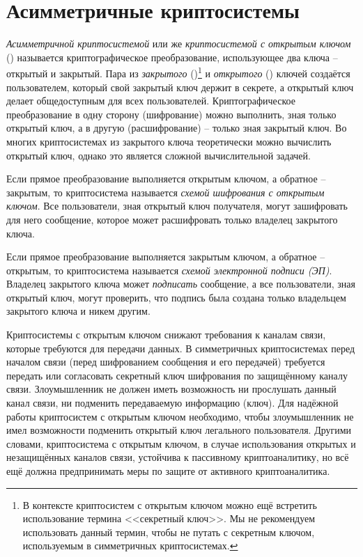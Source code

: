 \chapter{Асимметричные криптосистемы}\label{chapter-public-key}

\emph{Асимметричной криптосистемой} или же \emph{криптосистемой с открытым ключом} () называется криптографическое преобразование, использующее два ключа -- открытый и закрытый. Пара из \emph{закрытого} ()\footnote{В контексте криптосистем с открытым ключом можно ещё встретить использование термина <<секретный ключ>>. Мы не рекомендуем использовать данный термин, чтобы не путать с секретным ключом, используемым в симметричных криптосистемах.} и \emph{открытого} () ключей создаётся пользователем, который свой закрытый ключ держит в секрете, а открытый ключ делает общедоступным для всех пользователей. Криптографическое преобразование в одну сторону (шифрование) можно выполнить, зная только открытый ключ, а в другую (расшифрование) -- только зная закрытый ключ. Во многих криптосистемах из закрытого ключа теоретически можно вычислить открытый ключ, однако это является сложной вычислительной задачей.

Если прямое преобразование выполняется открытым ключом, а обратное -- закрытым, то криптосистема называется \emph{схемой шифрования с открытым ключом}. Все пользователи, зная открытый ключ получателя, могут зашифровать для него сообщение, которое может расшифровать только владелец закрытого ключа.

Если прямое преобразование выполняется закрытым ключом, а обратное -- открытым, то криптосистема называется \emph{схемой электронной подписи (ЭП)}. Владелец закрытого ключа может \emph{подписать} сообщение, а все пользователи, зная открытый ключ, могут проверить, что подпись была создана только владельцем закрытого ключа и никем другим.

Криптосистемы с открытым ключом снижают требования к каналам связи, которые требуются для передачи данных. В симметричных криптосистемах перед началом связи (перед шифрованием сообщения и его передачей) требуется передать или согласовать секретный ключ шифрования по защищённому каналу связи. Злоумышленник не должен иметь возможность ни прослушать данный канал связи, ни подменить передаваемую информацию (ключ). Для надёжной работы криптосистем с открытым ключом необходимо, чтобы злоумышленник не имел возможности подменить открытый ключ легального пользователя. Другими словами, криптосистема с открытым ключом, в случае использования открытых и незащищённых каналов связи, устойчива к пассивному криптоаналитику, но всё ещё должна предпринимать меры по защите от активного криптоаналитика.

